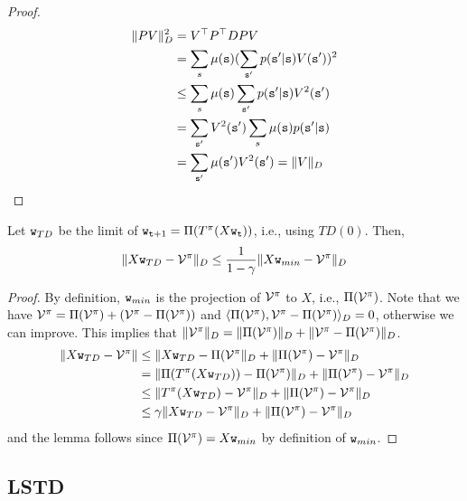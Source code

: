 \begin{leftbar}
\begin{proof}
\begin{align*}
\|PV\|_D^2 & =V^\top P^\top D P V \\
&= \sum_s \mu({\tt s}) (\sum_{{\tt s}'} p({\tt s}'|{\tt s}) V({\tt s}'))^2\\
&\leq \sum_s \mu({\tt s}) \sum_{{\tt s}'} p({\tt s}'|{\tt s}) V^2({\tt s}')\\
&=\sum_{{\tt s}'} V^2({\tt s}') \sum_s \mu({\tt s})p({\tt s}'|{\tt s})\\
&=\sum_{{\tt s}'} \mu({\tt s}')V^2({\tt s}')=\|V\|_D
\end{align*}
\end{proof}

\begin{lemma}
Let ${\tt w}_{TD}$ be the limit of
${\tt w}_{{\tt t}+1}=\Pi(T^\pi(X{\tt w}_{\tt t}))$, i.e., using
$TD(0)$. Then,
\[
\|X{\tt w}_{TD}-\mathcal{V}^\pi\|_D\leq
\frac{1}{1-\gamma}\|X{\tt w}_{min}-\mathcal{V}^\pi\|_D
\]
\end{lemma}

\begin{proof}
By definition, ${\tt w}_{min}$ is the projection of $\mathcal{V}^\pi$
to $X$, i.e., $\Pi(\mathcal{V}^\pi)$. Note that we have
$\mathcal{V}^\pi=
\Pi(\mathcal{V}^\pi)+(\mathcal{V}^\pi-\Pi(\mathcal{V}^\pi))$ and
$\langle\Pi(\mathcal{V}^\pi),\mathcal{V}^\pi-\Pi(\mathcal{V}^\pi)\rangle_D=0$,
otherwise we can improve. This implies that
$\|\mathcal{V}^\pi\|_D=\|\Pi(\mathcal{V}^\pi)\|_D+\|\mathcal{V}^\pi-\Pi(\mathcal{V}^\pi)\|_D$.
\begin{align*}
\|X{\tt w}_{TD}-\mathcal{V}^\pi\| &\leq
\|X{\tt w}_{TD}-\Pi(\mathcal{V}^\pi\|_D+\|\Pi(\mathcal{V}^\pi)-\mathcal{V}^\pi\|_D\\
&= \|\Pi(T^\pi(X{\tt w}_{TD}))-\Pi(\mathcal{V}^\pi)\|_D+\|\Pi(\mathcal{V}^\pi)-\mathcal{V}^\pi\|_D\\
&\leq \|T^\pi(X{\tt w}_{TD})-\mathcal{V}^\pi\|_D+\|\Pi(\mathcal{V}^\pi)-\mathcal{V}^\pi\|_D\\
&\leq \gamma \|X{\tt w}_{TD}-\mathcal{V}^\pi\|_D+\|\Pi(\mathcal{V}^\pi)-\mathcal{V}^\pi\|_D\\
\end{align*}
and the lemma follows since $\Pi(\mathcal{V}^\pi)=X{\tt w}_{min}$ by
definition of ${\tt w}_{min}$.
\end{proof}


\subsection{LSTD}



\end{leftbar}
